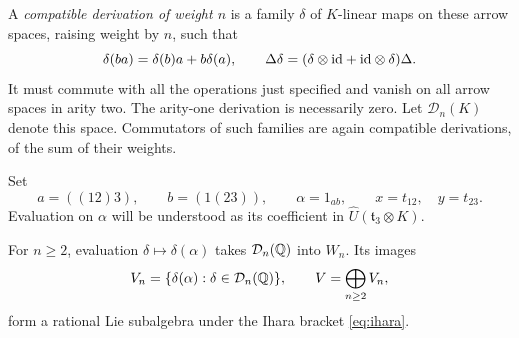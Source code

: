 A \emph{compatible derivation of weight $n$} is a family $\delta$ of
$K$-linear maps on these arrow spaces, raising weight by $n$, such that
\[
 \delta(ba)=\delta(b)a+b\delta(a),\qquad
 \Delta\delta=(\delta\otimes\mathrm{id}+\mathrm{id}\otimes\delta)\Delta.
\]
It must commute with all the operations just specified and vanish on
all arrow spaces in arity two.  The arity-one derivation is necessarily
zero.  Let $\mathcal D_n(K)$ denote this space.  Commutators of such
families are again compatible derivations, of the sum of their weights.

Set
\[
 a=((12)3),\qquad b=(1(23)),\qquad
 \alpha=1_{ab},\qquad x=t_{12},\quad y=t_{23}.
\]
Evaluation on $\alpha$ will be understood as its coefficient in
$\widehat U(\mathfrak t_3\otimes K)$.

\begin{proposition}\label{prop:categorical-values}
For $n\geq2$, evaluation $\delta\mapsto\delta(\alpha)$ takes
$\mathcal D_n(\mathbb Q)$ into $W_n$.  Its images
\[
 V_n=\{\delta(\alpha):\delta\in\mathcal D_n(\mathbb Q)\},\qquad
 V=\bigoplus_{n\geq2}V_n,
\]
form a rational Lie subalgebra under the Ihara bracket \eqref{eq:ihara}.
\end{proposition}

